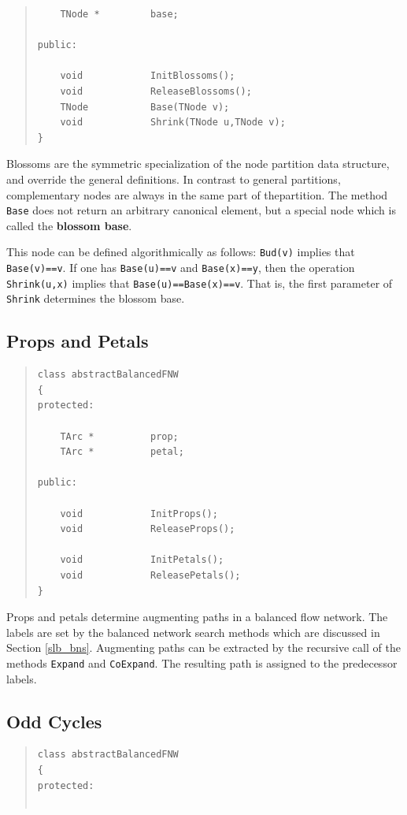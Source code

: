 \documentclass[a4paper,11pt,twoside]{book}
\begin{document}
\begin{multicols}{2}
\begin{quote}
\begin{verbatim}
    TNode *         base;

public:

    void            InitBlossoms();
    void            ReleaseBlossoms();
    TNode           Base(TNode v);
    void            Shrink(TNode u,TNode v);
}
\end{verbatim}
\end{quote}
Blossoms are the symmetric specialization of the node partition data structure,
and override the general definitions. In contrast to general partitions,
complementary nodes are always in the same part of thepartition. The method
\verb/Base/ does not return an arbitrary canonical element, but a special node 
which is called the {\bf blossom base}.

This node can be defined algorithmically as follows: \verb/Bud(v)/ implies that
\verb/Base(v)==v/. If one has \verb/Base(u)==v/ and \verb/Base(x)==y/, then the
operation \verb/Shrink(u,x)/ implies that \verb/Base(u)==Base(x)==v/. That is,
the first parameter of \verb/Shrink/ determines the blossom base.


\subsection{Props and Petals}
\label{slb_prop}
\methods
\begin{quote}
\begin{verbatim}
class abstractBalancedFNW
{
protected:

    TArc *          prop;
    TArc *          petal;

public:

    void            InitProps();
    void            ReleaseProps();

    void            InitPetals();
    void            ReleasePetals();
}
\end{verbatim}
\end{quote}
Props and petals determine augmenting paths in a balanced flow network. The
labels are set by the balanced network search methods which are discussed in
Section \ref{slb_bns}. Augmenting paths can be extracted by the recursive call of
the methods \verb/Expand/ and \verb/CoExpand/. The resulting path is assigned to
the predecessor labels.


\subsection{Odd Cycles}
\label{slb_odd}
\methods
\begin{quote}
\begin{verbatim}
class abstractBalancedFNW
{
protected:


\end{verbatim}
\end{quote}
\end{multicols}
\end{document}
